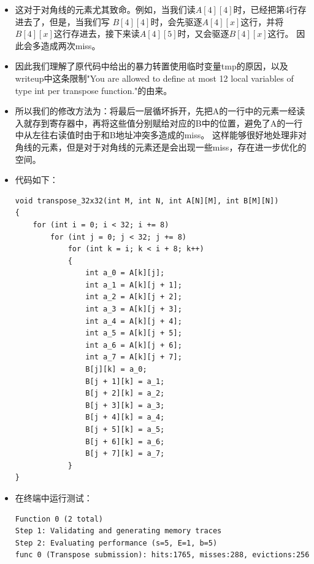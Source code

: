 \documentclass[12pt, a4paper, oneside]{ctexart}
\begin{document}
\begin{itemize}
    \item 这对于对角线的元素尤其致命。例如，当我们读$A[4][4]$时，已经把第4行存进去了，但是，当我们写
    $B[4][4]$时，会先驱逐$A[4][x]$这行，并将$B[4][x]$这行存进去，接下来读$A[4][5]$时，又会驱逐$B[4][x]$这行。
    因此会多造成两次miss。
    \item 因此我们理解了原代码中给出的暴力转置使用临时变量tmp的原因，以及writeup中这条限制"You are allowed to define at most 12 local variables of type int per transpose function."的由来。
    \item 所以我们的修改方法为：将最后一层循坏拆开，先把A的一行中的元素一经读入就存到寄存器中，再将这些值分别赋给对应的B中的位置，避免了A的一行中从左往右读值时由于和B地址冲突多造成的miss。
          这样能够很好地处理非对角线的元素，但是对于对角线的元素还是会出现一些miss，存在进一步优化的空间。
    \item 代码如下：
\begin{lstlisting}
void transpose_32x32(int M, int N, int A[N][M], int B[M][N])
{
    for (int i = 0; i < 32; i += 8)
        for (int j = 0; j < 32; j += 8)
            for (int k = i; k < i + 8; k++)
            {
                int a_0 = A[k][j];
                int a_1 = A[k][j + 1];
                int a_2 = A[k][j + 2];
                int a_3 = A[k][j + 3];
                int a_4 = A[k][j + 4];
                int a_5 = A[k][j + 5];
                int a_6 = A[k][j + 6];
                int a_7 = A[k][j + 7];
                B[j][k] = a_0;
                B[j + 1][k] = a_1;
                B[j + 2][k] = a_2;
                B[j + 3][k] = a_3;
                B[j + 4][k] = a_4;
                B[j + 5][k] = a_5;
                B[j + 6][k] = a_6;
                B[j + 7][k] = a_7;
            }
}
\end{lstlisting}
    \item 在终端中运行测试：
\begin{lstlisting}
Function 0 (2 total)
Step 1: Validating and generating memory traces
Step 2: Evaluating performance (s=5, E=1, b=5)
func 0 (Transpose submission): hits:1765, misses:288, evictions:256
\end{lstlisting}
\end{itemize}
\end{document}
